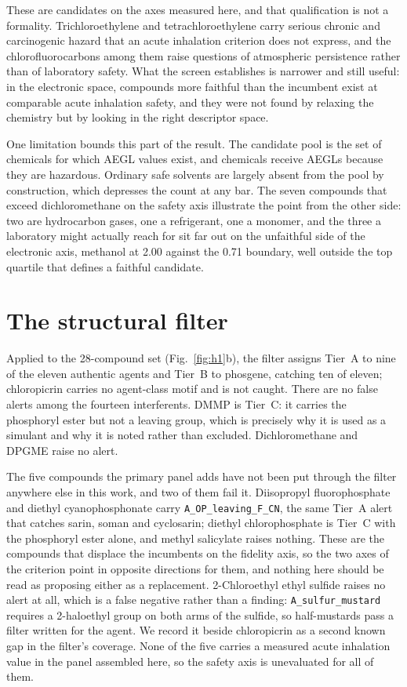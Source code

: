 \documentclass[journal=jacsat,manuscript=suppinfo,margin=1in]{achemso}
\begin{document}
\begin{sloppypar}
These are candidates on the axes measured here, and that qualification is not a
formality. Trichloroethylene and tetrachloroethylene carry serious chronic and
carcinogenic hazard that an acute inhalation criterion does not express, and the
chlorofluorocarbons among them raise questions of atmospheric persistence rather
than of laboratory safety. What the screen establishes is narrower and still
useful: in the electronic space, compounds more faithful than the incumbent
exist at comparable acute inhalation safety, and they were not found by relaxing
the chemistry but by looking in the right descriptor space.
\end{sloppypar}

One limitation bounds this part of the result. The candidate pool is the set of
chemicals for which AEGL values exist, and chemicals receive AEGLs because they
are hazardous. Ordinary safe solvents are largely absent from the pool by
construction, which depresses the count at any bar. The seven compounds that
exceed dichloromethane on the safety axis illustrate the point from the other
side: two are hydrocarbon gases, one a refrigerant, one a monomer, and the three
a laboratory might actually reach for sit far out on the unfaithful side of the
electronic axis, methanol at 2.00 against the 0.71 boundary, well outside the
top quartile that defines a faithful candidate.

\section{The structural filter}
\label{meth:alerts}

Applied to the 28-compound set (Fig.~\ref{fig:h1}b), the filter assigns Tier~A to nine of the eleven
authentic agents and Tier~B to phosgene, catching ten of eleven; chloropicrin
carries no agent-class motif and is not caught. There are no false alerts among
the fourteen interferents. DMMP is Tier~C: it carries the phosphoryl ester but
not a leaving group, which is precisely why it is used as a simulant and why it
is noted rather than excluded. Dichloromethane and DPGME raise no alert.

The five compounds the primary panel adds have not been put through the filter
anywhere else in this work, and two of them fail it. Diisopropyl
fluorophosphate and diethyl cyanophosphonate carry \texttt{A\_OP\_leaving\_F\_CN},
the same Tier~A alert that catches sarin, soman and cyclosarin; diethyl
chlorophosphate is Tier~C with the phosphoryl ester alone, and methyl
salicylate raises nothing. These are the compounds that displace the incumbents
on the fidelity axis, so the two axes of the criterion point in opposite
directions for them, and nothing here should be read as proposing either as a
replacement. 2-Chloroethyl ethyl sulfide raises no alert at all, which is a
false negative rather than a finding: \texttt{A\_sulfur\_mustard} requires a
2-haloethyl group on both arms of the sulfide, so half-mustards pass a filter
written for the agent. We record it beside chloropicrin as a second known gap
in the filter's coverage. None of the five carries a measured acute inhalation
value in the panel assembled here, so the safety axis is unevaluated for all
of them.
\end{document}
